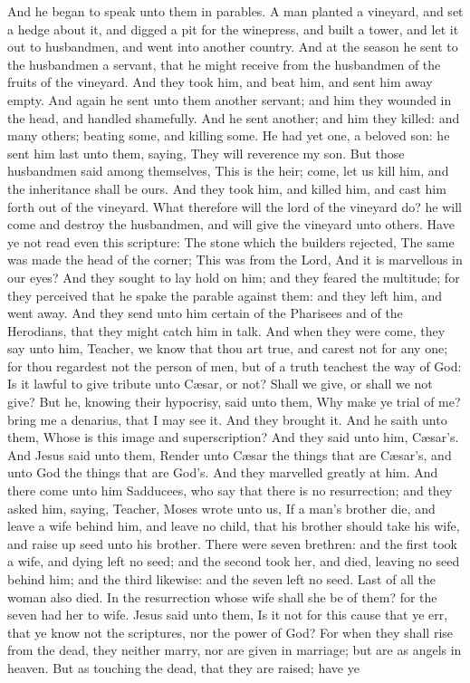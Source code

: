 And he began to speak unto them in parables. A man planted a vineyard, and set a hedge about it, and digged a pit for the winepress, and built a tower, and let it out to husbandmen, and went into another country. And at the season he sent to the husbandmen a servant, that he might receive from the husbandmen of the fruits of the vineyard. And they took him, and beat him, and sent him away empty. And again he sent unto them another servant; and him they wounded in the head, and handled shamefully. And he sent another; and him they killed: and many others; beating some, and killing some. He had yet one, a beloved son: he sent him last unto them, saying, They will reverence my son. But those husbandmen said among themselves, This is the heir; come, let us kill him, and the inheritance shall be ours. And they took him, and killed him, and cast him forth out of the vineyard. What therefore will the lord of the vineyard do? he will come and destroy the husbandmen, and will give the vineyard unto others. Have ye not read even this scripture: The stone which the builders rejected, The same was made the head of the corner;  This was from the Lord, And it is marvellous in our eyes?  And they sought to lay hold on him; and they feared the multitude; for they perceived that he spake the parable against them: and they left him, and went away.  And they send unto him certain of the Pharisees and of the Herodians, that they might catch him in talk. And when they were come, they say unto him, Teacher, we know that thou art true, and carest not for any one; for thou regardest not the person of men, but of a truth teachest the way of God: Is it lawful to give tribute unto Cæsar, or not? Shall we give, or shall we not give? But he, knowing their hypocrisy, said unto them, Why make ye trial of me? bring me a denarius, that I may see it. And they brought it. And he saith unto them, Whose is this image and superscription? And they said unto him, Cæsar’s. And Jesus said unto them, Render unto Cæsar the things that are Cæsar’s, and unto God the things that are God’s. And they marvelled greatly at him.  And there come unto him Sadducees, who say that there is no resurrection; and they asked him, saying, Teacher, Moses wrote unto us, If a man’s brother die, and leave a wife behind him, and leave no child, that his brother should take his wife, and raise up seed unto his brother. There were seven brethren: and the first took a wife, and dying left no seed; and the second took her, and died, leaving no seed behind him; and the third likewise: and the seven left no seed. Last of all the woman also died. In the resurrection whose wife shall she be of them? for the seven had her to wife. Jesus said unto them, Is it not for this cause that ye err, that ye know not the scriptures, nor the power of God? For when they shall rise from the dead, they neither marry, nor are given in marriage; but are as angels in heaven. But as touching the dead, that they are raised; have ye 